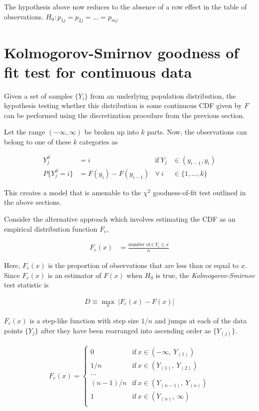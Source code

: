 The hypothesis above now reduces to the absence of a row effect in the table of observations. $ H_0 : p_{1j}  = p_{2j} = \dots  = p_{mj}$\\

\section{Kolmogorov-Smirnov goodness of fit test for continuous data}

Given a set of samples $ \{Y_i\} $ from an underlying population distribution, the hypothesis testing whether this distribution is some continuous CDF given by $ F $ can be performed using the discretization procedure from the previous section.

Let the range $ (-\infty, \infty) $ be broken up into $ k $ parts. Now, the observations can belong to one of these $ k $ categories as

\begin{align}
	Y^d_j &= i & \text{if}\ Y_j &\in (y_{i-1}, y_i) \\
	P\{Y_j^d = i\} &= F(y_i) - F(y_{i-1}) & \forall \ i &\in \{1,\dots,k\}
\end{align}

This creates a model that is amenable to the $ \chi^2 $ goodness-of-fit test outlined in the above sections.

Consider the alternative approach which involves estimating the CDF as an empirical distribution function $ F_e $,

\begin{align}
	F_e(x) &= \frac{\text{number of}\ i : Y_i \leq x}{n}
\end{align}

Here, $ F_e (x) $ is the proportion of observations that are less than or equal to $ x $. Since $ F_e (x) $ is an estimator of $ F(x) $ when $ H_0 $ is true, the \textit{Kolmogorov-Smirnov} test statistic is

\begin{align}
	D \equiv \max_{x}\  \Big|F_e (x) - F(x)\Big|
\end{align}

$ F_e (x) $ is a step-like function with step size $ 1/n $ and jumps at each of the data points $ \{Y_j\} $ after they have been rearranged into ascending order as $ \{Y_{(j)}\} $.

\begin{align}
	F_e (x) = 
	\begin{cases}
		0 & \text{if}\ x \in (-\infty,\ Y_{(1)}) \\
		1/n & \text{if}\ x \in (Y_{(1)},\ Y_{(2)}) \\
		\dots \\
		(n-1) / n & \text{if}\ x \in (Y_{(n-1)},\ Y_{(n)}) \\
		1 & \text{if}\ x \in (Y_{(n)},\ \infty) \\
	\end{cases}
\end{align}

